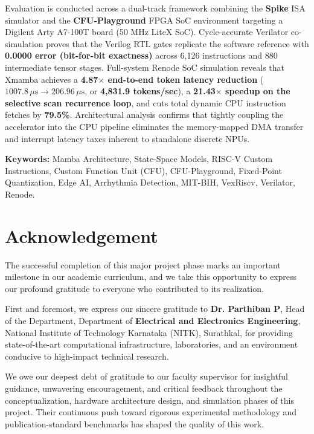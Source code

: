 \documentclass[11pt,a4paper,oneside]{report}
\begin{document}
Evaluation is conducted across a dual-track framework combining the \textbf{Spike} ISA simulator and the \textbf{CFU-Playground} FPGA SoC environment targeting a Digilent Arty A7-100T board (50 MHz LiteX SoC). Cycle-accurate Verilator co-simulation proves that the Verilog RTL gates replicate the software reference with \textbf{0.0000 error (bit-for-bit exactness)} across 6,126 instructions and 880 intermediate tensor stages. Full-system Renode SoC simulation reveals that Xmamba achieves a \textbf{4.87$\times$ end-to-end token latency reduction} ($1007.8\,\mu\text{s} \to 206.96\,\mu\text{s}$, or \textbf{4,831.9 tokens/sec}), a \textbf{21.43$\times$ speedup on the selective scan recurrence loop}, and cuts total dynamic CPU instruction fetches by \textbf{79.5\%}. Architectural analysis confirms that tightly coupling the accelerator into the CPU pipeline eliminates the memory-mapped DMA transfer and interrupt latency taxes inherent to standalone discrete NPUs.

\vspace{0.8cm}
\noindent\textbf{Keywords:} Mamba Architecture, State-Space Models, RISC-V Custom Instructions, Custom Function Unit (CFU), CFU-Playground, Fixed-Point Quantization, Edge AI, Arrhythmia Detection, MIT-BIH, VexRiscv, Verilator, Renode.
\clearpage

\chapter*{Acknowledgement}

The successful completion of this major project phase marks an important milestone in our academic curriculum, and we take this opportunity to express our profound gratitude to everyone who contributed to its realization.

First and foremost, we express our sincere gratitude to \textbf{Dr. Parthiban P}, Head of the Department, Department of \textbf{Electrical and Electronics Engineering}, National Institute of Technology Karnataka (NITK), Surathkal, for providing state-of-the-art computational infrastructure, laboratories, and an environment conducive to high-impact technical research.

We owe our deepest debt of gratitude to our faculty supervisor for insightful guidance, unwavering encouragement, and critical feedback throughout the conceptualization, hardware architecture design, and simulation phases of this project. Their continuous push toward rigorous experimental methodology and publication-standard benchmarks has shaped the quality of this work.
\end{document}
